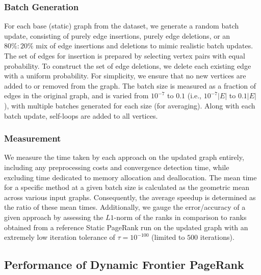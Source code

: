 


\subsubsection{Batch Generation}
\label{sec:batch-generation}

For each base (static) graph from the dataset, we generate a random batch update, consisting of purely edge insertions, purely edge deletions, or an $80\% : 20\%$ mix of edge insertions and deletions to mimic realistic batch updates. The set of edges for insertion is prepared by selecting vertex pairs with equal probability. To construct the set of edge deletions, we delete each existing edge with a uniform probability. For simplicity, we ensure that no new vertices are added to or removed from the graph. The batch size is measured as a fraction of edges in the original graph, and is varied from $10^{-7}$ to $0.1$ (i.e., $10^{-7}|E|$ to $0.1|E|$), with multiple batches generated for each size (for averaging). Along with each batch update, self-loops are added to all vertices.


\subsubsection{Measurement}
\label{sec:measurement}

We measure the time taken by each approach on the updated graph entirely, including any preprocessing costs and convergence detection time, while excluding time dedicated to memory allocation and deallocation. The mean time for a specific method at a given batch size is calculated as the geometric mean across various input graphs. Consequently, the average speedup is determined as the ratio of these mean times. Additionally, we gauge the error/accuracy of a given approach by assessing the $L1$-norm \cite{ohsaka2015efficient} of the ranks in comparison to ranks obtained from a reference Static PageRank run on the updated graph with an extremely low iteration tolerance of $\tau = 10^{-100}$ (limited to $500$ iterations).






% 
% 
% 
% 




\subsection{Performance of Dynamic Frontier PageRank}


